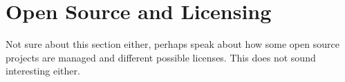 \section{Open Source and Licensing} \label{sec:chap2:opensource}
Not sure about this section either, perhaps speak about how some open source projects are managed and different possible licenses. This does not sound interesting either.

